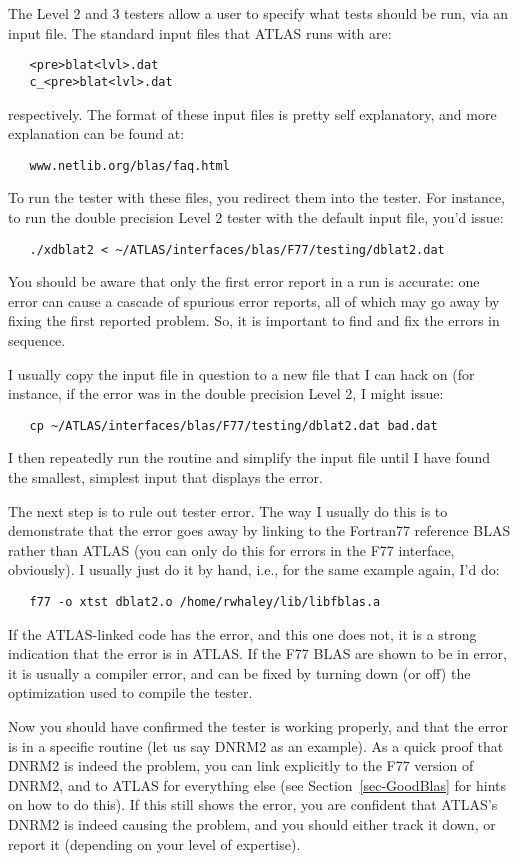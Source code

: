 \documentclass[11pt]{article}
\begin{document}
The Level 2 and 3 testers allow a user to specify what tests should be run,
via an input file.  The standard input files that ATLAS runs with are:
\begin{verbatim}
   <pre>blat<lvl>.dat
   c_<pre>blat<lvl>.dat
\end{verbatim}
respectively.  The format of these input files is pretty self explanatory,
and more explanation can be found at:
\begin{verbatim}
   www.netlib.org/blas/faq.html
\end{verbatim}
To run the tester with these files, you redirect them into the tester.  For
instance, to run the double precision Level 2 tester with the default input
file, you'd issue:
\begin{verbatim}
   ./xdblat2 < ~/ATLAS/interfaces/blas/F77/testing/dblat2.dat
\end{verbatim}

You should be aware that only the first error report in a run is accurate:
one error can cause a cascade of spurious error reports, all of which may go
away by fixing the first reported problem.  So, it is important to find and
fix the errors in sequence.

I usually copy the input file in question to a new file that
I can hack on (for instance, if the error was in the double precision Level 2,
I might issue:
\begin{verbatim}
   cp ~/ATLAS/interfaces/blas/F77/testing/dblat2.dat bad.dat
\end{verbatim}
I then repeatedly run the
routine and simplify the input file until I have found the smallest, simplest
input that displays the error.

The next step is to rule out tester error.  The way I usually
do this is to demonstrate that the error goes away by linking to the Fortran77
reference BLAS rather than ATLAS (you can only do this for errors in the
F77 interface, obviously).  I usually just do it by hand, i.e., for the
same example again, I'd do:
\begin{verbatim}
   f77 -o xtst dblat2.o /home/rwhaley/lib/libfblas.a
\end{verbatim}
If the ATLAS-linked code has the error, and this one does not, it is a
strong indication that the error is in ATLAS.  If the F77 BLAS are shown
to be in error, it is usually a compiler error, and can be fixed by turning
down (or off) the optimization used to compile the tester.

Now you should have confirmed the tester is working properly, and that
the error is in a specific routine (let us say DNRM2 as an example).
As a quick proof that DNRM2 is indeed the problem, you can link explicitly
to the F77 version of DNRM2, and to ATLAS for everything else (see
Section~\ref{sec-GoodBlas} for hints on how to do this).  If this
still shows the error, you are confident that ATLAS's DNRM2 is indeed causing 
the problem, and you should either track it down, or report it (depending on
your level of expertise).
\end{document}
